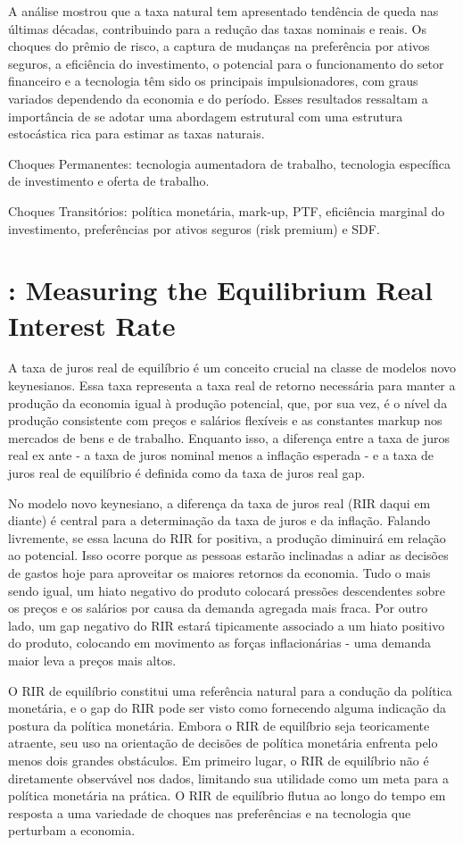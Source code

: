 \documentclass[11pt,oneside,a4paper]{article}
\begin{document}
A análise mostrou que a taxa natural tem apresentado tendência de queda nas últimas décadas, contribuindo para a redução das taxas nominais e reais. Os choques do prêmio de risco, a captura de mudanças na preferência por ativos seguros, a eficiência do investimento, o potencial para o funcionamento do setor financeiro e a tecnologia têm sido os principais impulsionadores, com graus variados dependendo da economia e do período. Esses resultados ressaltam a importância de se adotar uma abordagem estrutural com uma estrutura estocástica rica para estimar as taxas naturais.

Choques Permanentes: tecnologia aumentadora de trabalho, tecnologia específica de investimento e oferta de trabalho.

Choques Transitórios: política monetária, mark-up, PTF, eficiência marginal do investimento, preferências por ativos seguros (risk premium) e SDF.
%
%
\section{\citet{Justiniano:2010}: Measuring the Equilibrium Real Interest Rate }

A taxa de juros real de equilíbrio é um conceito crucial na classe de modelos novo keynesianos. Essa taxa representa a taxa real de retorno necessária para manter a produção da economia igual à produção potencial, que, por sua vez, é o nível da produção consistente com preços e salários flexíveis e as constantes markup nos mercados de bens e de trabalho. Enquanto isso, a diferença entre a taxa de juros real ex ante - a taxa de juros nominal menos a inflação esperada - e a taxa de juros real de equilíbrio é definida como da taxa de juros real gap.

No modelo novo keynesiano, a diferença da taxa de juros real (RIR daqui em diante) é central para a determinação da taxa de juros e da inflação. Falando livremente, se essa lacuna do RIR for positiva, a produção diminuirá em relação ao potencial. Isso ocorre porque as pessoas estarão inclinadas a adiar as decisões de gastos hoje para aproveitar os maiores retornos da economia. Tudo o mais sendo igual, um hiato negativo do produto colocará pressões descendentes sobre os preços e os salários por causa da demanda agregada mais fraca. Por outro lado, um gap negativo do RIR estará tipicamente associado a um hiato positivo do produto, colocando em movimento as forças inflacionárias - uma demanda maior leva a preços mais altos.

O RIR de equilíbrio constitui uma referência natural para a condução da política monetária, e o gap do RIR pode ser visto como fornecendo alguma indicação da postura da política monetária. Embora o RIR de equilíbrio seja teoricamente atraente, seu uso na orientação de decisões de política monetária enfrenta pelo menos dois grandes obstáculos. Em primeiro lugar, o RIR de equilíbrio não é diretamente observável nos dados, limitando sua utilidade como um meta para a política monetária na prática. O RIR de equilíbrio flutua ao longo do tempo em resposta a uma variedade de choques nas preferências e na tecnologia que perturbam a economia.
\end{document}
